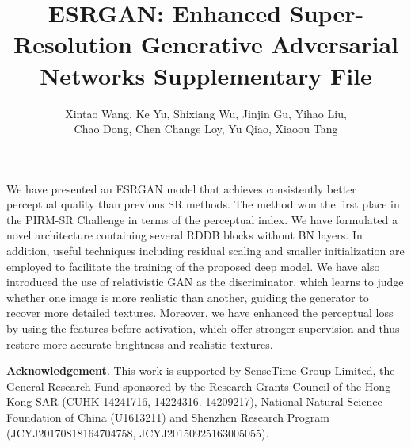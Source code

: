 \documentclass[runningheads]{llncs}
\begin{document}
We have presented an ESRGAN model that achieves consistently better perceptual quality than previous SR 
methods. The method won the first place in the PIRM-SR Challenge in terms of the perceptual index. 
We have formulated a novel architecture containing several RDDB blocks without BN layers. In addition, useful 
techniques including residual scaling and smaller initialization are employed to facilitate the training of the 
proposed deep model.
We have also introduced the use of relativistic GAN as the discriminator, which learns to judge whether one image is 
more realistic  
than another, guiding the generator to recover more detailed textures.
Moreover, we have enhanced the perceptual loss by using the features before activation, which offer stronger 
supervision 
and thus restore more accurate brightness and realistic textures.




\vspace{0.5cm}
\noindent\textbf{Acknowledgement}.
This work is supported by SenseTime Group Limited, the General Research Fund sponsored by the Research Grants 
Council of the Hong Kong SAR (CUHK 14241716, 14224316. 14209217), National Natural Science Foundation of China 
(U1613211) and Shenzhen Research Program \\ (JCYJ20170818164704758, JCYJ20150925163005055).



{\scriptsize 


}



\pagestyle{headings}


\title{ESRGAN: Enhanced Super-Resolution Generative Adversarial Networks Supplementary File\vspace{-0.3cm}}



\author{
	Xintao Wang, Ke Yu, Shixiang Wu, Jinjin Gu, Yihao Liu, \\
	Chao Dong, Chen Change Loy, Yu Qiao, Xiaoou Tang
}
\end{document}

